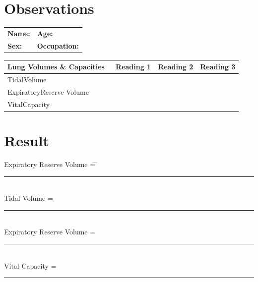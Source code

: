 \documentclass[a4paper,12pt,openany,twoside]{book}
\begin{document}
														\section*{Observations}

															\begin{tabular}{p{3in} p{1in}}
																\textbf{Name:}  & \textbf{Age:}\\
																\textbf{Sex:}   & \textbf{Occupation:}
															\end{tabular}

\begin{table}[H]
\centering
\begin{tabular}{|l|l|l|l|} 
	\hline
	\textbf{Lung			Volumes \& Capacities}~							 &  \textbf{Reading			1} &  \textbf{Reading			2} &  \textbf{Reading			3}  \\ 
	\hline
	TidalVolume                                   &                       &                        &                        \\ 
	\hline
	ExpiratoryReserve Volume                      &                       &                        &                        \\ 
	\hline
	VitalCapacity                                 &                       &                        &                        \\
	\hline
\end{tabular}
\end{table}

															\section*{Result}
															\vspace{-7mm}
															\begin{tabbing}
																Expiratory Reserve Volume \= = \= \rule{5cm}{.5pt}\kill\\
																Tidal Volume \> = \> \rule{5cm}{.5pt}\\
																Expiratory Reserve Volume \> = \> \rule{5cm}{.5pt}\\
																Vital Capacity \> = \> \rule{5cm}{.5pt}\\
															\end{tabbing}

\end{document}
